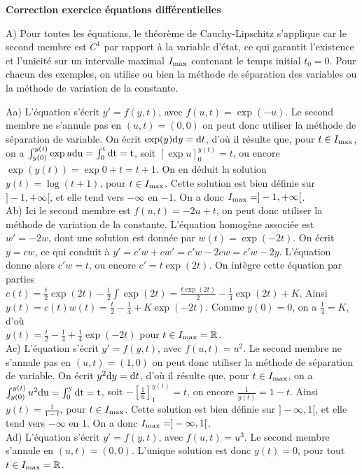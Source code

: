 \documentclass[11pt]{article}
\theoremstyle{exostyle}
\begin{document}
\newpage

\noindent
{\bf Correction exercice \'equations diff\'erentielles}

\noindent
A) Pour toutes les \'equations, le th\'eor\`eme de Cauchy-Lipschitz s'applique car le second membre est $C^1$ par rapport 
\`a la variable d'\'etat, ce qui garantit l'existence et l'unicit\'e sur un intervalle maximal $I_{\rm max}$ contenant le temps initial $t_0=0$.  Pour chacun des exemples, on utilise ou bien la m\'ethode de s\'eparation des variables ou la m\'ethode de variation de la constante.

\noindent
Aa) L'\'equation s'\'ecrit $y'=f(y, t)$,  avec $f(u, t)=\exp(-u)$. Le second membre ne s'annule pas en $(u, t)=(0, 0)$ on peut donc utiliser la m\'ethode de s\'eparation de variable. On \'ecrit 
$\exp(y) {\rm d} y={\rm d} t$, d'o\`u il r\'esulte que, pour  $t \in I_{\rm max}$,  on a   
$\int_{y(0)}^{y(t)} \exp u \rm d u=\int_0^t dt=t$,  soit 
$\displaystyle {[\exp u]_0^{y(t)}=t}$, ou encore $\exp(y(t))=\exp 0+t=t+1$. On en d\'eduit la solution 
$y(t)=\log  (t+1)$, pour $t \in I_{\rm max}$. Cette solution est bien d\'efinie sur $]-1, +\infty[$, et elle tend vers $-\infty$ en $-1$. On a donc $I_{\rm max}=]-1, +\infty[$.\\
Ab) Ici le second membre est $f(u, t)=-2u+t$, on peut donc utiliser la m\'ethode de variation de la constante. L'\'equation homog\`ene associ\'ee est $w'=-2w$, dont une solution est donn\'ee par $w(t)=\exp(-2t)$. On \'ecrit $y=cw$, ce qui conduit \`a
$y'=c'w+cw'=c'w-2cw=c'w-2y$. L'\'equation donne alors $c'w=t$, ou encore $c'=t\exp(2t)$. On int\`egre cette \'equation par parties \\
$\displaystyle{c(t)=\frac{t}{2}\exp(2t)-\frac{1}{2}\int \exp(2t)=\frac{t\exp(2t)}{2}-\frac{1}{4} \exp(2t)+K}$. Ainsi \\
$y(t)=c(t)w(t)=\frac{t}{2}-\frac 14+ K\exp(-2t)$. Comme $y(0)=0$, on a $\frac 14=K$, d'o\`u \\
$y(t)=\frac{t}{2}-\frac 14+\frac 14 \exp(-2t)$ pour $t \in I_{\rm max}=\mathbb R$. \\
Ac)  L'\'equation s'\'ecrit $y'=f(y, t)$,  avec $f(u, t)=u^2$. Le second membre ne s'annule pas en $(u, t)=(1, 0)$ on peut donc utiliser la m\'ethode de s\'eparation de variable. On \'ecrit 
$y^2 {\rm d} y={\rm d} t$, d'o\`u il r\'esulte que, pour  $t \in I_{\rm max}$,  on a   $\int_{y(0)}^{y(t)} u^2 \rm d u=\int_0^y dt=t$,  soit $\displaystyle {-\left[\frac{1}{u}\right]_1^{y(t)}=t}$, on encore $\displaystyle{\frac{1}{y(t)}=1-t}$. Ainsi
$y(t)=\frac{1}{1-t}$,  pour $t \in I_{\rm max}$. Cette solution est bien d\'efinie sur $]-\infty,1[$, et elle tend vers $-\infty$ en $1$. On a donc $I_{\rm max}=]-\infty, 1[$.\\
Ad) L'\'equation s'\'ecrit $y'=f(y, t)$,  avec $f(u, t)=u^3$. Le second membre  s'annule en $(u, t)=(0, 0)$. L'unique solution est donc $y(t)=0$, pour tout $t \in I_{\rm max}=\mathbb  R$. \\
\end{document}
